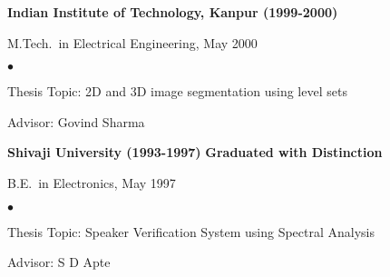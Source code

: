 \documentclass[overlapped,line,letterpaper]{res}
\newenvironment{list1}{
  \begin{list}{\ding{113}}{%
      \setlength{\itemsep}{0in}
      \setlength{\parsep}{0in} \setlength{\parskip}{0in}
      \setlength{\topsep}{0in} \setlength{\partopsep}{0in}
      \setlength{\leftmargin}{0.17in}}}{\end{list}}
\newenvironment{list2}{
  \begin{list}{$\bullet$}{%
      \setlength{\itemsep}{0in}
      \setlength{\parsep}{0in} \setlength{\parskip}{0in}
      \setlength{\topsep}{0in} \setlength{\partopsep}{0in}
      \setlength{\leftmargin}{0.2in}}}{\end{list}}
\begin{document}
\begin{resume}
{\bf Indian Institute of Technology, Kanpur (1999-2000)}\\
\vspace*{-.1in}
\begin{list1}
\item[] M.Tech.~in Electrical Engineering, May 2000
\begin{list2}
\item Thesis Topic: 2D and 3D image segmentation using level sets
\item Advisor: Govind Sharma
\end{list2}
\end{list1}

{\bf Shivaji University (1993-1997)} \textbf{Graduated with Distinction}\\
\vspace*{-.1in}
\begin{list1}
\item[] B.E.~in Electronics, May 1997
\begin{list2}
\item Thesis Topic: Speaker Verification System using Spectral Analysis
\item Advisor: S D Apte
\end{list2}
\end{list1}


\end{resume}
\end{document}
